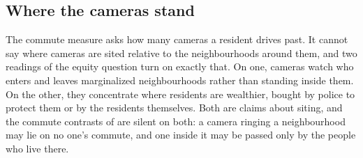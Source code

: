 \documentclass[11pt,twoside]{article}
\begin{document}
\subsection{Where the cameras stand}
\label{sec:results:siting}

The commute measure asks how many cameras a resident drives past. It cannot say where cameras
are sited relative to the neighbourhoods around them, and two readings of the equity question
turn on exactly that. On one, cameras watch who enters and leaves marginalized neighbourhoods
rather than standing inside them. On the other, they concentrate where residents are
wealthier, bought by police to protect them or by the residents themselves. Both are claims
about siting, and the commute contrasts of  are
silent on both: a camera ringing a neighbourhood may lie on no one's commute, and one inside it
may be passed only by the people who live there.
\end{document}
